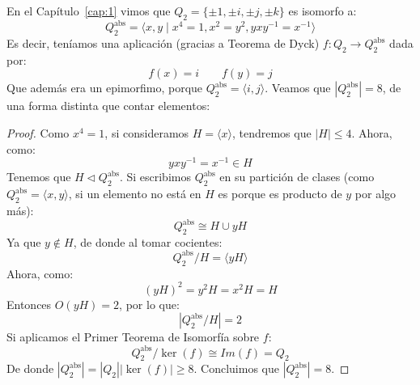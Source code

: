 \begin{ejemplo}
    En el Capítulo~\ref{cap:1} vimos que $Q_2 = \{\pm 1, \pm i, \pm j, \pm k\}$ es isomorfo a:
    \begin{equation*}
        Q_2^{\text{abs}} = \langle x,y\mid x^4=1, x^2=y^2, yxy^{-1} = x^{-1} \rangle 
    \end{equation*}
    Es decir, teníamos una aplicación (gracias a Teorema de Dyck) $f:Q_2\to Q_2^{\text{abs}}$ dada por:
    \begin{equation*}
        f(x) = i \qquad f(y) = j
    \end{equation*}
    Que además era un epimorfimo, porque $Q_2^{\text{abs}} = \langle i,j \rangle $. Veamos que $|Q_2^{\text{abs}}| = 8$, de una forma distinta que contar elementos:
    \begin{proof} %
        Como $x^4 = 1$, si consideramos $H = \langle x \rangle $, tendremos que $|H| \leq 4$. Ahora, como:
        \begin{equation*}
            yxy^{-1} = x^{-1}\in H 
        \end{equation*}
        Tenemos que $H\lhd Q_2^{\text{abs}}$. Si escribimos $Q_2^{\text{abs}}$ en su partición de clases (como $Q_2^{\text{abs}} = \langle x,y \rangle $, si un elemento no está en $H$ es porque es producto de $y$ por algo más):
        \begin{equation*}
            Q_2^{\text{abs}} \cong H\cup yH
        \end{equation*}
        Ya que $y\notin H$, de donde al tomar cocientes:
        \begin{equation*}
            Q_2^{\text{abs}}/H = \langle yH \rangle 
        \end{equation*}
        Ahora, como:
        \begin{equation*}
            {(yH)}^{2} = y^2H = x^2H = H
        \end{equation*}
        Entonces $O(yH) = 2$, por lo que:
        \begin{equation*}
            |Q_2^{\text{abs}}/H| = 2
        \end{equation*}
        Si aplicamos el Primer Teorema de Isomorfía sobre $f$:
        \begin{equation*}
            Q_2^{\text{abs}}/\ker(f) \cong Im(f) = Q_2
        \end{equation*}
        De donde $|Q_2^{\text{abs}}| = |Q_2||\ker(f)| \geq 8$. Concluimos que $|Q_2^{\text{abs}}| = 8$.
    \end{proof}
\end{ejemplo}

